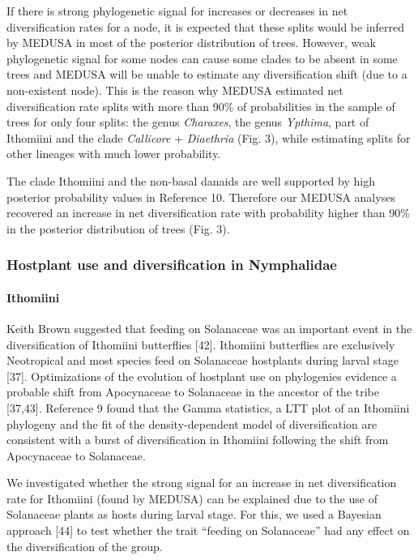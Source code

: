 \documentclass[10pt]{article}
\begin{document}
If there is strong phylogenetic signal for increases or decreases in net
diversification rates for a node, it is expected that these splits would
be inferred by MEDUSA in most of the posterior distribution of trees.
However, weak phylogenetic signal for some nodes can cause some clades
to be absent in some trees and MEDUSA will be unable to estimate any
diversification shift (due to a non-existent node). This is the reason
why MEDUSA estimated net diversification rate splits with more than 90\%
of probabilities in the sample of trees for only four splits: the genus
\emph{Charaxes}, the genus \emph{Ypthima}, part of Ithomiini and the
clade \emph{Callicore} + \emph{Diaethria} (Fig. 3), while estimating
splits for other lineages with much lower probability.

The clade Ithomiini and the non-basal danaids are well supported by high
posterior probability values in Reference 10. Therefore our MEDUSA
analyses recovered an increase in net diversification rate with
probability higher than 90\% in the posterior distribution of trees
(Fig. 3).

\subsubsection{Hostplant use and diversification in
Nymphalidae}\label{hostplant-use-and-diversification-in-nymphalidae}

\paragraph{Ithomiini}\label{ithomiini}

Keith Brown suggested that feeding on Solanaceae was an important event
in the diversification of Ithomiini butterflies {[}42{]}. Ithomiini
butterflies are exclusively Neotropical and most species feed on
Solanaceae hostplants during larval stage {[}37{]}. Optimizations of the
evolution of hostplant use on phylogenies evidence a probable shift from
Apocynaceae to Solanaceae in the ancestor of the tribe {[}37,43{]}.
Reference 9 found that the Gamma statistics, a LTT plot of an Ithomiini
phylogeny and the fit of the density-dependent model of diversification
are consistent with a burst of diversification in Ithomiini following
the shift from Apocynaceae to Solanaceae.

We investigated whether the strong signal for an increase in net
diversification rate for Ithomiini (found by MEDUSA) can be explained
due to the use of Solanaceae plants as hosts during larval stage. For
this, we used a Bayesian approach {[}44{]} to test whether the trait
``feeding on Solanaceae'' had any effect on the diversification of the
group.
\end{document}
